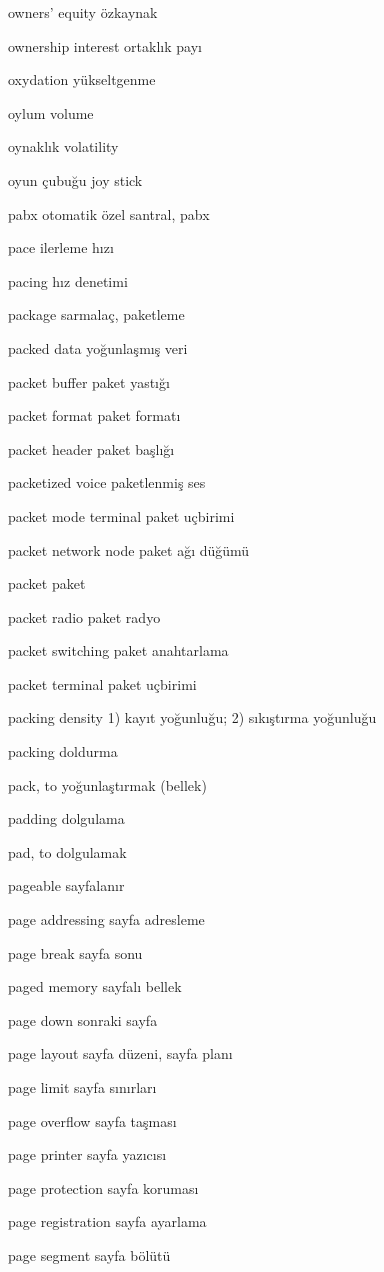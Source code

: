 \documentclass[12pt,fleqn]{article}\usepackage{../../common}
\begin{document}
owners' equity özkaynak

ownership interest ortaklık payı

oxydation yükseltgenme

oylum volume

oynaklık volatility

oyun çubuğu joy stick

pabx otomatik özel santral, pabx

pace ilerleme hızı

pacing hız denetimi

package sarmalaç, paketleme

packed data yoğunlaşmış veri

packet buffer paket yastığı

packet format paket formatı

packet header paket başlığı

packetized voice paketlenmiş ses

packet mode terminal paket uçbirimi

packet network node paket ağı düğümü

packet paket

packet radio paket radyo

packet switching paket anahtarlama

packet terminal paket uçbirimi

packing density 1) kayıt yoğunluğu; 2) sıkıştırma yoğunluğu

packing doldurma

pack, to yoğunlaştırmak (bellek)

padding dolgulama

pad, to dolgulamak

pageable sayfalanır

page addressing sayfa adresleme

page break sayfa sonu

paged memory sayfalı bellek

page down sonraki sayfa

page layout sayfa düzeni, sayfa planı

page limit sayfa sınırları

page overflow sayfa taşması

page printer sayfa yazıcısı

page protection sayfa koruması

page registration sayfa ayarlama

page segment sayfa bölütü
\end{document}
